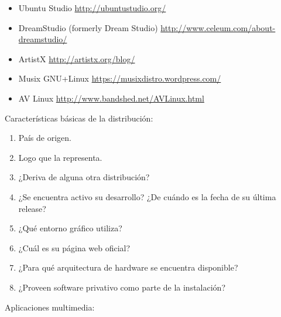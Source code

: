 \documentclass[12pt]{article}
\begin{document}
\begin{itemize}
\item Ubuntu Studio \url{http://ubuntustudio.org/}
\item DreamStudio (formerly Dream Studio) \url{http://www.celeum.com/about-dreamstudio/}
\item ArtistX \url{http://artistx.org/blog/}
\item Musix GNU+Linux \url{https://musixdistro.wordpress.com/}
\item AV Linux \url{http://www.bandshed.net/AVLinux.html}
\end{itemize}


Características básicas de la distribución:
\begin{enumerate}
\item País de origen. 
\item Logo que la representa. 
\item ¿Deriva de alguna otra distribución? 
\item ¿Se encuentra activo su desarrollo? ¿De cuándo es la fecha de su última release? 
\item ¿Qué entorno gráfico utiliza?
\item ¿Cuál es su página web oficial?
\item ¿Para qué arquitectura de hardware se encuentra disponible?
\item ¿Proveen software privativo como parte de la instalación? 
\end{enumerate}

Aplicaciones multimedia:
\end{document}
